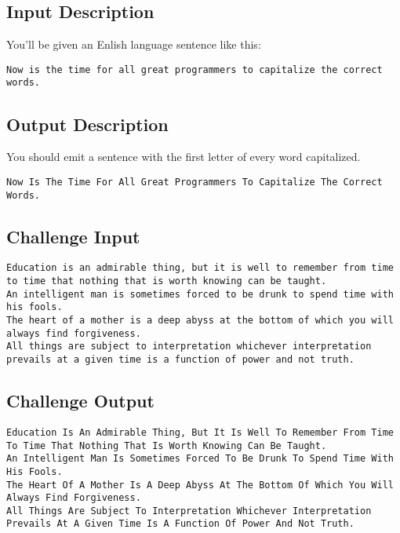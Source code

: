 \subsection{Input Description}\label{input-description-13}

You'll be given an Enlish language sentence like this:

\begin{verbatim}
Now is the time for all great programmers to capitalize the correct words.
\end{verbatim}

\subsection{Output Description}\label{output-description-13}

You should emit a sentence with the first letter of every word
capitalized.

\begin{verbatim}
Now Is The Time For All Great Programmers To Capitalize The Correct Words.
\end{verbatim}

\subsection{Challenge Input}\label{challenge-input-13}

\begin{verbatim}
Education is an admirable thing, but it is well to remember from time to time that nothing that is worth knowing can be taught.
An intelligent man is sometimes forced to be drunk to spend time with his fools.
The heart of a mother is a deep abyss at the bottom of which you will always find forgiveness.
All things are subject to interpretation whichever interpretation prevails at a given time is a function of power and not truth.
\end{verbatim}

\subsection{Challenge Output}\label{challenge-output-10}

\begin{verbatim}
Education Is An Admirable Thing, But It Is Well To Remember From Time To Time That Nothing That Is Worth Knowing Can Be Taught.
An Intelligent Man Is Sometimes Forced To Be Drunk To Spend Time With His Fools.
The Heart Of A Mother Is A Deep Abyss At The Bottom Of Which You Will Always Find Forgiveness.
All Things Are Subject To Interpretation Whichever Interpretation Prevails At A Given Time Is A Function Of Power And Not Truth.
\end{verbatim}

